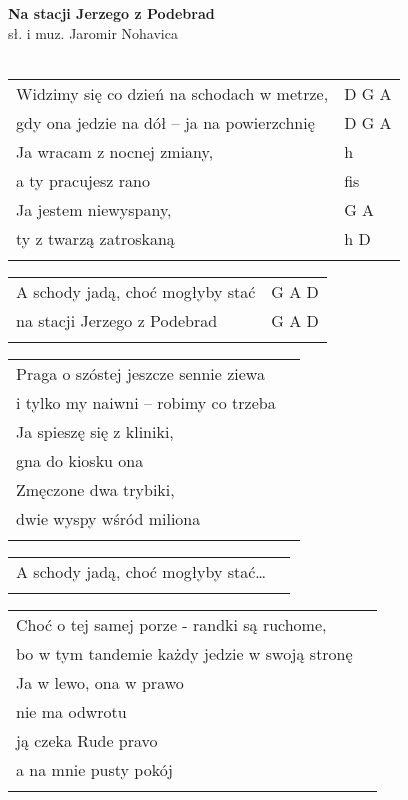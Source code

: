 \documentclass[a5paper]{article}
\begin{document}


\noindent
\fontsize{12pt}{15pt}\selectfont
\textbf{Na stacji Jerzego z Podebrad} \\
\fontsize{8pt}{10pt}\selectfont
sł. i muz. Jaromir Nohavica \\ \\
\fontsize{10pt}{12pt}\selectfont
{}
\noindent
\begin{tabular}{@{}p{8.5cm}p{3cm}@{}}
Widzimy się co dzień na schodach w metrze, & D G A \\
gdy ona jedzie na dół – ja na powierzchnię & D G A \\
Ja wracam z nocnej zmiany, & h \\
a ty pracujesz rano & fis \\
Ja jestem niewyspany, & G A \\
ty z twarzą zatroskaną & h D \\ \\
\end{tabular}
 
\noindent
\begin{tabular}{@{}p{7.5cm}p{3cm}@{}}
A schody jadą, choć mogłyby stać & G A D \\
na stacji Jerzego z Podebrad & G A D  \\ \\
\end{tabular}
 
\noindent
\begin{tabular}{@{}p{8.5cm}p{3cm}@{}}
Praga o szóstej jeszcze sennie ziewa\\
i tylko my naiwni – robimy co trzeba\\
Ja spieszę się z kliniki,\\
gna do kiosku ona\\
Zmęczone dwa trybiki,\\
dwie wyspy wśród miliona\\ \\
\end{tabular}
 
\noindent
\begin{tabular}{@{}p{8.5cm}p{3cm}@{}}
A schody jadą, choć mogłyby stać… \\ \\
\end{tabular}
 
\noindent
\begin{tabular}{@{}p{8.5cm}p{3cm}@{}}
Choć o tej samej porze - randki są ruchome, \\
bo w tym tandemie każdy jedzie w swoją stronę \\
Ja w lewo, ona w prawo\\
nie ma odwrotu \\
ją czeka Rude pravo\\
a na mnie pusty pokój\\\\
\end{tabular}
 
\end{document}

